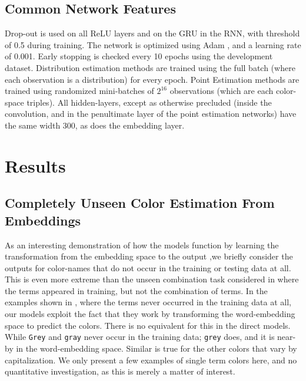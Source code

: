 \documentclass[]{book}
\newcommand{\parencite}{\citep}
\newcommand{\natlang}[1]{\texttt{#1}}
\begin{document}
\subsection{Common Network Features}
Drop-out\parencite{srivastava2014dropout}  is used on all ReLU layers and on the GRU in the RNN, with threshold of 0.5 during training.
The network is optimized using Adam \parencite{kingma2014adam}, and a learning rate of 0.001.
Early stopping is checked every 10 epochs using the development dataset.
Distribution estimation methods are trained using the full batch (where each observation is a distribution) for every epoch.
Point Estimation methods are trained using randomized mini-batches of $2^{16}$ observations (which are each color-space triples).
All hidden-layers, except as otherwise precluded (inside the convolution, and in the penultimate layer of the point estimation networks) have the same width 300, as does the embedding layer.



\section{Results}\label{sec:results}






\subsection{Completely Unseen Color Estimation From Embeddings}\label{sec:embeddingonly}
As an interesting demonstration of how the models function by learning the transformation from the embedding space to the output ,we briefly consider the outputs for color-names that do not occur in the training or testing data at all.
This is even more extreme than the unseen combination task considered in  where the terms appeared in training, but not the combination of terms.
In the examples shown in , where the terms never occurred in the training data at all, our models exploit the fact that they work by transforming the word-embedding space to predict the colors.
There is no equivalent for this in the direct models.
While \natlang{Grey} and \natlang{gray} never occur in the training data; \natlang{grey} does, and it is near-by in the word-embedding space.
Similar is true for the other colors that vary by capitalization.
We only present a few examples of single term colors here, and no quantitative investigation, as this is merely a matter of interest.
\end{document}
